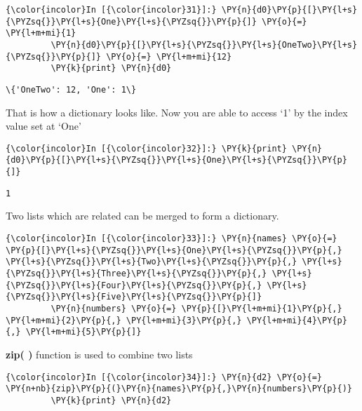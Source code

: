     \begin{Verbatim}[commandchars=\\\{\}]
{\color{incolor}In [{\color{incolor}31}]:} \PY{n}{d0}\PY{p}{[}\PY{l+s}{\PYZsq{}}\PY{l+s}{One}\PY{l+s}{\PYZsq{}}\PY{p}{]} \PY{o}{=} \PY{l+m+mi}{1}
         \PY{n}{d0}\PY{p}{[}\PY{l+s}{\PYZsq{}}\PY{l+s}{OneTwo}\PY{l+s}{\PYZsq{}}\PY{p}{]} \PY{o}{=} \PY{l+m+mi}{12} 
         \PY{k}{print} \PY{n}{d0}
\end{Verbatim}

    \begin{Verbatim}[commandchars=\\\{\}]
\{'OneTwo': 12, 'One': 1\}
    \end{Verbatim}

    That is how a dictionary looks like. Now you are able to access `1' by
the index value set at `One'

    \begin{Verbatim}[commandchars=\\\{\}]
{\color{incolor}In [{\color{incolor}32}]:} \PY{k}{print} \PY{n}{d0}\PY{p}{[}\PY{l+s}{\PYZsq{}}\PY{l+s}{One}\PY{l+s}{\PYZsq{}}\PY{p}{]}
\end{Verbatim}

    \begin{Verbatim}[commandchars=\\\{\}]
1
    \end{Verbatim}

    Two lists which are related can be merged to form a dictionary.

    \begin{Verbatim}[commandchars=\\\{\}]
{\color{incolor}In [{\color{incolor}33}]:} \PY{n}{names} \PY{o}{=} \PY{p}{[}\PY{l+s}{\PYZsq{}}\PY{l+s}{One}\PY{l+s}{\PYZsq{}}\PY{p}{,} \PY{l+s}{\PYZsq{}}\PY{l+s}{Two}\PY{l+s}{\PYZsq{}}\PY{p}{,} \PY{l+s}{\PYZsq{}}\PY{l+s}{Three}\PY{l+s}{\PYZsq{}}\PY{p}{,} \PY{l+s}{\PYZsq{}}\PY{l+s}{Four}\PY{l+s}{\PYZsq{}}\PY{p}{,} \PY{l+s}{\PYZsq{}}\PY{l+s}{Five}\PY{l+s}{\PYZsq{}}\PY{p}{]}
         \PY{n}{numbers} \PY{o}{=} \PY{p}{[}\PY{l+m+mi}{1}\PY{p}{,} \PY{l+m+mi}{2}\PY{p}{,} \PY{l+m+mi}{3}\PY{p}{,} \PY{l+m+mi}{4}\PY{p}{,} \PY{l+m+mi}{5}\PY{p}{]}
\end{Verbatim}

    \textbf{zip( )} function is used to combine two lists

    \begin{Verbatim}[commandchars=\\\{\}]
{\color{incolor}In [{\color{incolor}34}]:} \PY{n}{d2} \PY{o}{=} \PY{n+nb}{zip}\PY{p}{(}\PY{n}{names}\PY{p}{,}\PY{n}{numbers}\PY{p}{)}
         \PY{k}{print} \PY{n}{d2}
\end{Verbatim}

